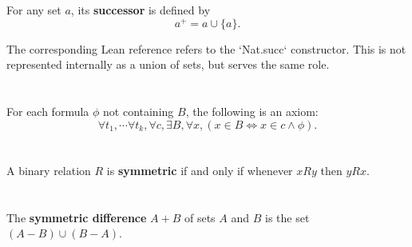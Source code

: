 \documentclass{report}
\begin{document}
For any set $a$, its \textbf{successor} is defined by $$a^+ = a \cup \{a\}.$$

\begin{note}
  The corresponding Lean reference refers to the `Nat.succ` constructor.
  This is not represented internally as a union of sets, but serves the same
    role.
\end{note}

\begin{definition}


\end{definition}

\section{}%

For each formula $\phi$ not containing $B$, the following is an axiom:
  $$\forall t_1, \cdots \forall t_k, \forall c,
      \exists B, \forall x, (x \in B \iff x \in c \land \phi).$$

\begin{axiom}


\end{axiom}

\section{}%

A binary relation $R$ is \textbf{symmetric} if and only if whenever $xRy$ then
  $yRx$.

\begin{definition}


\end{definition}

\section{}%

The \textbf{symmetric difference} $A + B$ of sets $A$ and $B$ is the set
  $(A - B) \cup (B - A)$.

\begin{definition}


\end{definition}
\end{document}
